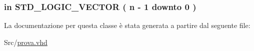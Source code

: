 \hypertarget{classprova_a7b9da25245767111877eb06273992a1a}{
\subsubsection[{y}]{ {\bfseries \textcolor{vhdlchar}{in}\textcolor{vhdlchar}{ }} {\bfseries \textcolor{vhdlchar}{S\+T\+D\+\_\+\+L\+O\+G\+I\+C\+\_\+\+V\+E\+C\+T\+O\+R}\textcolor{vhdlchar}{ }\textcolor{vhdlchar}{(}\textcolor{vhdlchar}{ }\textcolor{vhdlchar}{ }\textcolor{vhdlchar}{ }\textcolor{vhdlchar}{ }{\bfseries {\bf n}} \textcolor{vhdlchar}{-\/}\textcolor{vhdlchar}{ } \textcolor{vhdldigit}{1} \textcolor{vhdlchar}{ }\textcolor{vhdlchar}{downto}\textcolor{vhdlchar}{ }\textcolor{vhdlchar}{ } \textcolor{vhdldigit}{0} \textcolor{vhdlchar}{ }\textcolor{vhdlchar}{)}\textcolor{vhdlchar}{ }} \hspace{0.3cm}{\ttfamily [Port]}}}\label{classprova_a7b9da25245767111877eb06273992a1a}


La documentazione per questa classe è stata generata a partire dal seguente file\+:\begin{DoxyCompactItemize}
\item 
Src/\hyperlink{prova_8vhd}{prova.\+vhd}\end{DoxyCompactItemize}
